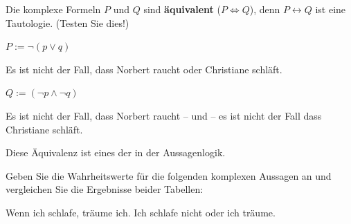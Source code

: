 \begin{frame}

Die komplexe Formeln $P$ und $Q$ sind \textbf{äquivalent} ($P \Leftrightarrow Q$), denn $P \leftrightarrow Q$ ist eine Tautologie. (Testen Sie dies!)

\begin{exe}
	
	 $P := \lnot (p \lor q)$

	Es ist nicht der Fall, dass Norbert raucht oder Christiane schläft.
	
	 $Q := (\lnot p \land \lnot q)$
	
	Es ist nicht der Fall, dass Norbert raucht -- und -- es ist nicht der Fall dass Christiane schläft.	

\end{exe}

Diese Äquivalenz ist eines der  in der Aussagenlogik.

\end{frame}


\begin{frame}

Geben Sie die Wahrheitswerte für die folgenden komplexen Aussagen an und vergleichen Sie die Ergebnisse beider Tabellen:

\ea\label{ex:Equi7} Wenn ich schlafe, träume ich.
\ex\label{ex:Equi8} Ich schlafe nicht oder ich träume.
\z 	

\end{frame}

